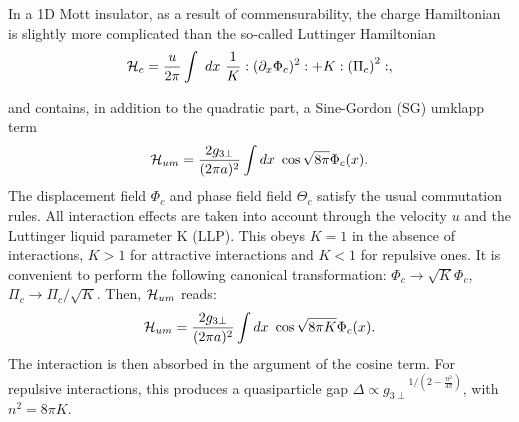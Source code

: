 In a 1D Mott insulator, as a result of
commensurability, the charge Hamiltonian is slightly more complicated
than the so-called Luttinger Hamiltonian 
\begin{equation}
\label{LL}
 {\cal H}_c=\frac{u}{2\pi}\int\ dx\ \frac{1}{K}:(\partial_x\Phi_c)^2:
+K:{(\Pi_c)}^2:,
\end{equation} 

and contains, in addition to
the quadratic part, a Sine-Gordon (SG) umklapp term
\begin{equation}
{\cal H}_{um}=\frac{2g_{3\perp}}{(2\pi a)^2}\int dx\ 
\cos\sqrt{8\pi}\Phi_c(x).
\end{equation}
The displacement field $\Phi_c$ and phase field field $\Theta_c$ satisfy
the usual commutation rules.
All interaction effects are taken into account through the velocity
$u$ and the Luttinger liquid parameter K (LLP). 
This obeys $K=1$ in the absence of interactions, $K>1$ for
attractive interactions and $K<1$ for repulsive ones. 
It is convenient to
perform the following canonical transformation:
$\Phi_c\rightarrow \sqrt{K}
\Phi_c$, $\Pi_c\rightarrow\Pi_c/\sqrt{K}$.
Then, ${\cal H}_{um}$ reads:
\begin{equation}
{\cal H}_{um}=\frac{2g_{3\perp}}{(2\pi a)^2}\int dx\ 
\cos\sqrt{8\pi K}\Phi_c(x).
\end{equation}
The interaction is then absorbed in the argument of the cosine term. For
repulsive interactions, this produces a quasiparticle gap $\Delta\propto
{g_{3\perp}}^{1/(2-\frac{n^2}{4\pi})}$, with $n^2=8\pi K$. 

